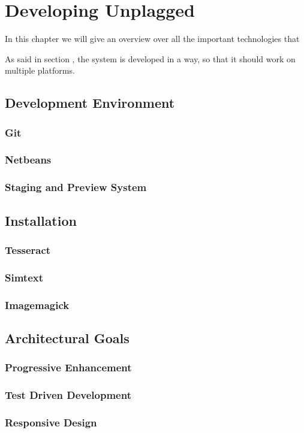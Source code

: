 \chapter{Developing Unplagged}\label{chap:developingUnplagged}

In this chapter we will give an overview over all the important technologies that

As said in section , the system is developed in a way, so that it should work on multiple platforms.

\section{Development Environment}

\subsection{Git}
\subsection{Netbeans}
\subsection{Staging and Preview System}

\section{Installation}
\subsection{Tesseract}
\subsection{Simtext}
\subsection{Imagemagick}



\section{Architectural Goals}

\subsection{Progressive Enhancement}

\subsection{Test Driven Development}

\subsection{Responsive Design}